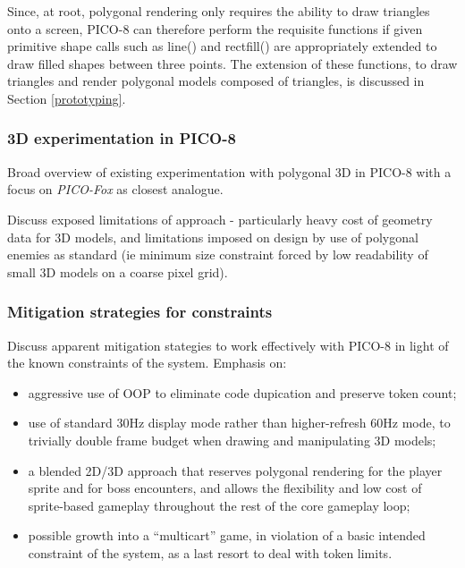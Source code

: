\documentclass[11pt]{article}
\begin{document}
Since, at root, polygonal rendering only requires the ability to draw triangles onto a
screen, PICO-8 can therefore perform the requisite functions if given primitive shape calls such
as line() and rectfill() are appropriately extended to draw filled shapes between three points.
The extension of these functions, to draw triangles and render polygonal models composed of
triangles, is discussed in Section \ref{prototyping}.

\subsubsection*{3D experimentation in PICO-8}
Broad overview of existing experimentation with polygonal 3D in PICO-8 with a
focus on \textit{PICO-Fox} as closest analogue. 

Discuss exposed limitations of approach - particularly heavy cost of geometry data
for 3D models, and limitations imposed on design by use of polygonal enemies as
standard (ie minimum size constraint forced by low readability of small 3D models
on a coarse pixel grid).

\subsubsection*{Mitigation strategies for constraints}
Discuss apparent mitigation stategies to work effectively with PICO-8 in light of
the known constraints of the system. Emphasis on:
\begin{itemize}
   \item aggressive use of OOP to eliminate code dupication and preserve token count;
   \item use of standard 30Hz display mode rather than higher-refresh 60Hz mode, to
   trivially double frame budget when drawing and manipulating 3D models;
   \item a blended 2D/3D approach that reserves polygonal rendering for the player
   sprite and for boss encounters, and allows the flexibility and low cost of
   sprite-based gameplay throughout the rest of the core gameplay loop;
   \item possible growth into a ``multicart'' game, in violation of a basic intended
   constraint of the system, as a last resort to deal with token limits.
\end{itemize}

\end{document}
